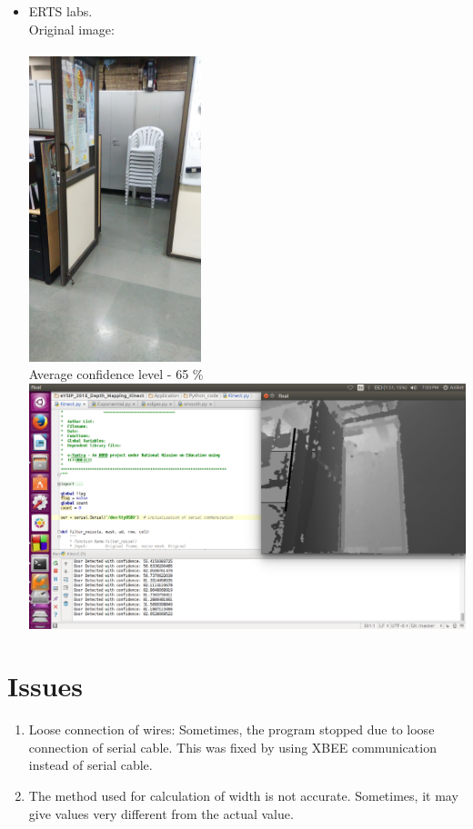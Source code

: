 \documentclass{report}
\begin{document}
\begin{itemize}
 \item ERTS labs. \\
  Original image: \\ \\
 \includegraphics[width = 5cm]{Erts_labs.jpg} \\
 Average confidence level - 65 \% \\
 \includegraphics[width = 15cm]{erts_lab_confidence.png} 

\end{itemize}


\chapter{Issues}
\begin{enumerate}
 \item Loose connection of wires: Sometimes, the program stopped due to loose connection of serial cable. This was fixed by using
 XBEE communication instead of serial cable.
 \item The method used for calculation of width is not accurate. Sometimes, it may give values very different from the actual value.
\end{enumerate}
\end{document}
